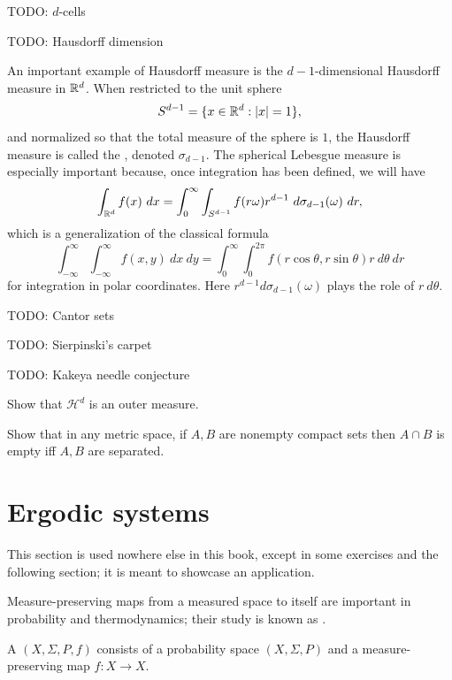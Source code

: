 TODO: $d$-cells

TODO: Hausdorff dimension

\begin{example}\label{Lebesgue measure on sphere}
An important example of Hausdorff measure is the $d-1$-dimensional Hausdorff measure in $\mathbb{R}^{d}$.
When restricted to the unit sphere
\[S^{d - 1} = \{x \in \mathbb{R}^{d}: |x| = 1\},\]
and normalized so that the total measure of the sphere is $1$, the Hausdorff measure is called the , denoted $\sigma_{d - 1}$.
The spherical Lebesgue measure is especially important because, once integration has been defined, we will have
\[\int_{\mathbb{R}^{d}} f(x) ~dx = \int_{0}^{\infty} \int_{S^{d - 1}} f(r\omega) r^{d - 1}~d\sigma_{d - 1}(\omega) ~dr,\]
which is a generalization of the classical formula
\[\int_{-\infty}^{\infty} \int_{-\infty}^{\infty} f(x, y) ~dx ~dy = \int_{0}^{\infty} \int_{0}^{2\pi} f(r \cos \theta, r \sin \theta) r~d\theta ~dr\]
for integration in polar coordinates. Here $r^{d - 1} d\sigma_{d - 1}(\omega)$ plays the role of $r~d\theta$.
\end{example}

TODO: Cantor sets

TODO: Sierpinski's carpet

TODO: Kakeya needle conjecture

\begin{exercise}\label{Hausdorff is outer measure}
Show that $\mathcal H^d$ is an outer measure.
\end{exercise}

\begin{exercise}
Show that in any metric space, if $A, B$ are nonempty compact sets then $A \cap B$ is empty iff $A,B$ are separated.
\end{exercise}


\section{Ergodic systems}
This section is used nowhere else in this book, except in some exercises and the following section; it is meant to showcase an application.

Measure-preserving maps from a measured space to itself are important in probability and thermodynamics; their study is known as .

\begin{definition}
A  $(X, \Sigma, P, f)$ consists of a probability space $(X, \Sigma, P)$ and a measure-preserving map $f: X \to X$.
\end{definition}


